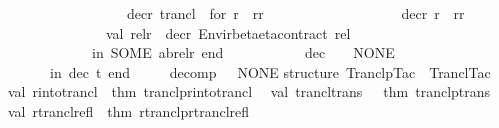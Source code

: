 \begin{isabellebody}
\ \ \ \ \ \ \ \ \ \ \ \ \ \ \ \ \ \ {\isacharbar}{\kern0pt}\ decr\ \isactrlConstUNDERSCORE {\isasymopen}trancl\ {\isacharunderscore}{\kern0pt}\ for\ r{\isasymclose}\ {\isacharequal}{\kern0pt}\ {\isacharparenleft}{\kern0pt}r{\isacharcomma}{\kern0pt}{\isachardoublequote}{\kern0pt}r{\isacharplus}{\kern0pt}{\isachardoublequote}{\kern0pt}{\isacharparenright}{\kern0pt}\isanewline
\ \ \ \ \ \ \ \ \ \ \ \ \ \ \ \ \ \ {\isacharbar}{\kern0pt}\ decr\ r\ {\isacharequal}{\kern0pt}\ {\isacharparenleft}{\kern0pt}r{\isacharcomma}{\kern0pt}{\isachardoublequote}{\kern0pt}r{\isachardoublequote}{\kern0pt}{\isacharparenright}{\kern0pt}{\isacharsemicolon}{\kern0pt}\isanewline
\ \ \ \ \ \ \ \ \ \ \ \ \ \ \ \ val\ {\isacharparenleft}{\kern0pt}rel{\isacharcomma}{\kern0pt}r{\isacharparenright}{\kern0pt}\ {\isacharequal}{\kern0pt}\ decr\ {\isacharparenleft}{\kern0pt}Envir{\isachardot}{\kern0pt}beta{\isacharunderscore}{\kern0pt}eta{\isacharunderscore}{\kern0pt}contract\ rel{\isacharparenright}{\kern0pt}{\isacharsemicolon}{\kern0pt}\isanewline
\ \ \ \ \ \ \ \ \ \ \ \ \ \ in\ SOME\ {\isacharparenleft}{\kern0pt}a{\isacharcomma}{\kern0pt}b{\isacharcomma}{\kern0pt}rel{\isacharcomma}{\kern0pt}r{\isacharparenright}{\kern0pt}\ end\isanewline
\ \ \ \ \ \ \ \ \ \ {\isacharbar}{\kern0pt}\ dec\ {\isacharunderscore}{\kern0pt}\ {\isacharequal}{\kern0pt}\ \ NONE\isanewline
\ \ \ \ \ \ \ \ in\ dec\ t\ end\isanewline
\ \ \ \ {\isacharbar}{\kern0pt}\ decomp\ {\isacharunderscore}{\kern0pt}\ {\isacharequal}{\kern0pt}\ NONE{\isacharsemicolon}{\kern0pt}\isanewline
{\isacharparenright}{\kern0pt}{\isacharsemicolon}{\kern0pt}\isanewline
\isanewline
structure\ Tranclp{\isacharunderscore}{\kern0pt}Tac\ {\isacharequal}{\kern0pt}\ Trancl{\isacharunderscore}{\kern0pt}Tac\isanewline
{\isacharparenleft}{\kern0pt}\isanewline
\ \ val\ r{\isacharunderscore}{\kern0pt}into{\isacharunderscore}{\kern0pt}trancl\ {\isacharequal}{\kern0pt}\ {\isacharat}{\kern0pt}{\isacharbraceleft}{\kern0pt}thm\ tranclp{\isachardot}{\kern0pt}r{\isacharunderscore}{\kern0pt}into{\isacharunderscore}{\kern0pt}trancl{\isacharbraceright}{\kern0pt}{\isacharsemicolon}{\kern0pt}\isanewline
\ \ val\ trancl{\isacharunderscore}{\kern0pt}trans\ \ {\isacharequal}{\kern0pt}\ {\isacharat}{\kern0pt}{\isacharbraceleft}{\kern0pt}thm\ tranclp{\isacharunderscore}{\kern0pt}trans{\isacharbraceright}{\kern0pt}{\isacharsemicolon}{\kern0pt}\isanewline
\ \ val\ rtrancl{\isacharunderscore}{\kern0pt}refl\ {\isacharequal}{\kern0pt}\ {\isacharat}{\kern0pt}{\isacharbraceleft}{\kern0pt}thm\ rtranclp{\isachardot}{\kern0pt}rtrancl{\isacharunderscore}{\kern0pt}refl{\isacharbraceright}{\kern0pt}{\isacharsemicolon}{\kern0pt}\isanewline

\end{isabellebody}
